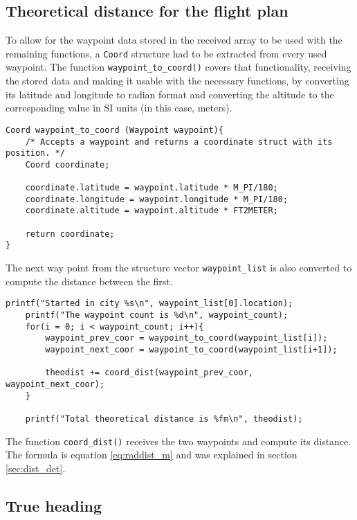 \documentclass{article}
\begin{document}
\subsection{Theoretical distance for the flight plan}

To allow for the waypoint data stored in the received array to be used with the remaining functions, a \texttt{Coord} structure had to be extracted from every used waypoint. The function \texttt{waypoint_to_coord()} covers that functionality, receiving the stored data and making it usable with the necessary functions, by converting its latitude and longitude to radian format and converting the altitude to the corresponding value in SI units (in this case, meters).

\begin{verbatim}
Coord waypoint_to_coord (Waypoint waypoint){
    /* Accepts a waypoint and returns a coordinate struct with its position. */
    Coord coordinate;
    
    coordinate.latitude = waypoint.latitude * M_PI/180;
    coordinate.longitude = waypoint.longitude * M_PI/180;
    coordinate.altitude = waypoint.altitude * FT2METER;
    
    return coordinate;
}
\end{verbatim}

The next way point from the structure vector \texttt{waypoint_list} is also converted to compute the distance between the first. 

\begin{verbatim}
printf("Started in city %s\n", waypoint_list[0].location);
    printf("The waypoint count is %d\n", waypoint_count);
    for(i = 0; i < waypoint_count; i++){
        waypoint_prev_coor = waypoint_to_coord(waypoint_list[i]);
        waypoint_next_coor = waypoint_to_coord(waypoint_list[i+1]);
        
        theodist += coord_dist(waypoint_prev_coor, waypoint_next_coor);
    }
    
    printf("Total theoretical distance is %fm\n", theodist);
\end{verbatim}

The function \texttt{coord_dist()} receives the two waypoints and compute its distance. The formula is equation \ref{eq:raddist_m} and was explained in section \ref{sec:dist_det}.

\subsection{True heading}
\end{document}
